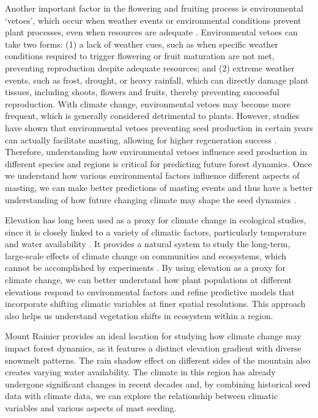 \documentclass[11pt,letter]{article}
\begin{document}
Another important factor in the flowering and fruiting process is environmental `vetoes', which occur when weather events or environmental conditions prevent plant processes, even when resources are adequate \citep{bogdziewicz2022will}. Environmental vetoes can take two forms: (1) a lack of weather cues, such as when specific weather conditions required to trigger flowering or fruit maturation are not met, preventing reproduction despite adequate resources; and (2) extreme weather events, such as frost, drought, or heavy rainfall, which can directly damage plant tissues, including shoots, flowers and fruits, thereby preventing successful reproduction. With climate change, environmental vetoes may become more frequent, which is generally considered detrimental to plants. However, studies have shown that environmental vetoes preventing seed production in certain years can actually facilitate masting, allowing for higher regeneration success \citep{bogdziewicz2018correlated, bogdziewicz2019environmental}. Therefore, understanding how environmental vetoes influence seed production in different species and regions is critical for predicting future forest dynamics.  Once we understand how various environmental factors influence different aspects of masting, we can make better predictions of masting events and thus have a better understanding of how future changing climate may shape the seed dynamics \citep{hacket2021climate}.

Elevation has long been used as a proxy for climate change in ecological studies, since it is closely linked to a variety of climatic factors, particularly temperature and water availability \citep{korner2007use}. It provides a natural system to study the long-term, large-scale effects of climate change on communities and ecosystems, which cannot be accomplished by experiments \citep{sundqvist2013community}. By using elevation as a proxy for climate change, we can better understand how plant populations at different elevations respond to environmental factors and refine predictive models that incorporate shifting climatic variables at finer spatial resolutions. This approach also helps us understand vegetation shifts in ecosystem within a region.

Mount Rainier provides an ideal location for studying how climate change may impact forest dynamics, as it features a distinct elevation gradient with diverse snowmelt patterns. The rain shadow effect on different sides of the mountain also creates varying water availability. The climate in this region has already undergone significant changes in recent decades and, by combining historical seed data with climate data, we can explore the relationship between climatic variables and various aspects of mast seeding.
\end{document}
